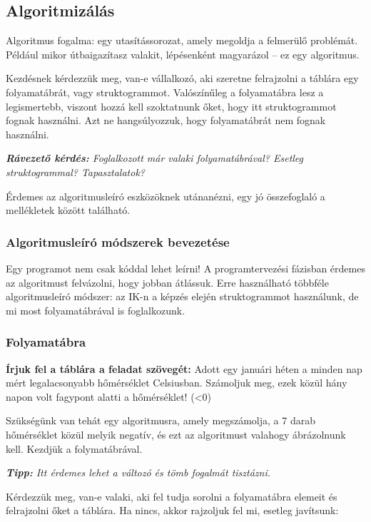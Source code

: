\documentclass[../Main.tex]{subfiles}
\begin{document}
\subsection{Algoritmizálás}

Algoritmus fogalma: egy utasítássorozat, amely megoldja a felmerülő problémát.
Például mikor útbaigazítasz valakit, lépésenként magyarázol – ez egy algoritmus. 

Kezdésnek kérdezzük meg, van-e vállalkozó, aki szeretne felrajzolni a táblára egy
folyamatábrát, vagy struktogrammot. Valószínűleg a folyamatábra lesz a legismertebb,
viszont hozzá kell szoktatnunk őket, hogy itt struktogrammot fognak használni.
Azt ne hangsúlyozzuk, hogy folyamatábrát nem fognak használni.

\textit{\textbf{Rávezető kérdés:} Foglalkozott már valaki folyamatábrával? Esetleg struktogrammal? Tapasztalatok?}

Érdemes az algoritmusleíró eszközöknek utánanézni, egy jó összefoglaló a mellékletek között található.

\subsubsection{Algoritmusleíró módszerek bevezetése}

Egy programot nem csak kóddal lehet leírni!
A programtervezési fázisban érdemes az algoritmust felvázolni, hogy jobban átlássuk. Erre használható
többféle algoritmusleíró módszer: az IK-n a képzés elején struktogrammot használunk, de mi most folyamatábrával
is foglalkozunk.

\subsubsection{Folyamatábra}

\textbf{Írjuk fel a táblára a feladat szövegét:}
Adott egy januári héten a minden nap mért legalacsonyabb hőmérséklet Celsiusban.
Számoljuk meg, ezek közül hány napon volt fagypont alatti a hőmérséklet! (<0)

Szükségünk van tehát egy algoritmusra, amely megszámolja, a 7 darab hőmérséklet közül melyik
negatív, és ezt az algoritmust valahogy ábrázolnunk kell. Kezdjük a folymatábrával.

\textit{\textbf{Tipp: } Itt érdemes lehet a változó és tömb fogalmát tisztázni.}

Kérdezzük meg, van-e valaki, aki fel tudja sorolni a folyamatábra elemeit és felrajzolni őket a táblára.
Ha nincs, akkor rajzoljuk fel mi, esetleg javítsunk:
\end{document}

